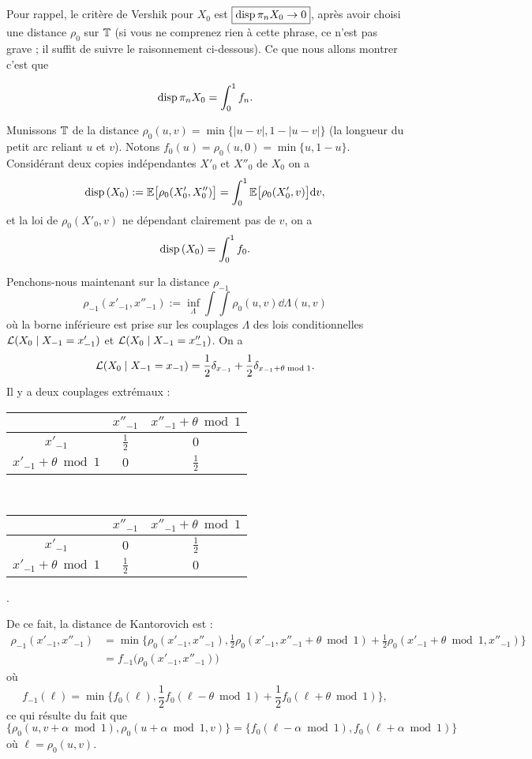 \documentclass[12pt,a4paper]{article}
\begin{document}
Pour rappel, le critère de Vershik pour $X_0$ est $\boxed{\textrm{disp}\, \pi_n X_0 \to 0}$, 
après avoir choisi une distance $\rho_0$ sur $\mathbb{T}$ 
(si vous ne comprenez rien à cette phrase, ce n'est pas grave ; il suffit de suivre 
le raisonnement ci-dessous). 
Ce que nous allons montrer c'est que 

\begin{equation}\label{eq:disp}
\textrm{disp}\, \pi_n X_0 = \int_0^1 f_n. 
\end{equation}

Munissons $\mathbb{T}$ de la distance $\rho_0(u,v) = \min\bigl\{|u-v|, 1-|u-v|\}$ 
(la longueur du petit arc reliant $u$ et $v$).  
Notons $f_0(u) = \rho_0(u,0) = \min\{u, 1-u\}$. 
Considérant deux copies indépendantes $X'_0$ et $X''_0$ de $X_0$ on a
$$
\textrm{disp}\,(X_0) := \mathbb{E}\bigl[\rho_0(X'_0, X''_0)\bigr] 
= \int_0^1 \mathbb{E}\bigl[\rho_0(X'_0, v)\bigr] \mathrm{d} v,
$$
et la loi de $\rho_0(X'_0, v)$ ne dépendant clairement pas de $v$, on a 
$$
\textrm{disp}\,(X_0) = \int_0^1 f_0.
$$

Penchons-nous maintenant sur la distance $\rho_{-1}$
$$
\rho_{-1}(x'_{-1}, x''_{-1}) := \inf_{\Lambda} \int\int\rho_0(u, v) \dd\Lambda(u,v)
$$
où la borne inférieure est prise sur les couplages $\Lambda$ des lois conditionnelles 
$\mathcal{L}(X_0 \mid X_{-1}=x'_{-1})$ et $\mathcal{L}(X_0 \mid X_{-1}=x''_{-1})$.  
On a 
$$
\mathcal{L}(X_0 \mid X_{-1}=x_{-1}) = \frac12 \delta_{x_{-1}} + \frac12 \delta_{x_{-1} + \theta \bmod 1}.  
$$
Il y a deux couplages extrémaux :

\begin{tabular}{c|c|c}
 & $x''_{-1}$ & $x''_{-1} + \theta \bmod 1$ \\
 \hline 
$x'_{-1}$ & $\frac12$ & $0$ \\
\hline 
$x'_{-1} + \theta \bmod 1$ & $0$ & $\frac12$ 
\end{tabular}
\quad {}\,
\begin{tabular}{c|c|c}
 & $x''_{-1}$ & $x''_{-1} + \theta \bmod 1$ \\
 \hline 
$x'_{-1}$ & $0$ & $\frac12$ \\
\hline 
$x'_{-1} + \theta \bmod 1$ & $\frac12$ & $0$ 
\end{tabular}.

\medskip
De ce fait, la distance de Kantorovich est :
\begin{align*}
\rho_{-1}(x'_{-1}, x''_{-1}) & = \min\bigl\{ 
\rho_0(x'_{-1}, x''_{-1}), 
\frac12 \rho_0(x'_{-1}, x''_{-1} + \theta \bmod 1) + \frac12 \rho_0(x'_{-1}+ \theta \bmod 1, x''_{-1})
\bigr\} \\ 
& = f_{-1}\bigl(\rho_0(x'_{-1}, x''_{-1})\bigr)
\end{align*}
où 
$$
\boxed{
f_{-1}(\ell) = \min\bigl\{f_0(\ell), 
\frac12 f_0(\ell-\theta\bmod 1) +\frac12 f_0(\ell+\theta \bmod1)\bigr\}
},
$$
ce qui résulte du fait que 
\begin{equation}\label{eq:propertyrho0}
\bigl\{ 
\rho_0(u, v + \alpha \bmod 1), \rho_0(u + \alpha \bmod 1, v)
\bigr\} = 
\bigl\{f_0(\ell-\alpha\bmod 1), f_0(\ell+\alpha \bmod1)\bigr\}
\end{equation}
où $\ell=\rho_0(u,v)$.
\end{document}

